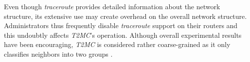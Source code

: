 Even though {\sl traceroute}
provides detailed information about the network structure, 
its extensive use may create overhead on the overall network structure. 
Administrators thus frequently
disable {\sl traceroute} support on their routers and this 
undoubtly affects \emph{T2MC}'s operation.
Although overall experimental results have been encouraging, 
\emph{T2MC} is considered rather coarse-grained as it only
classifies neighbors into two groups \cite{QLZG2009}.
%
%
%
%
